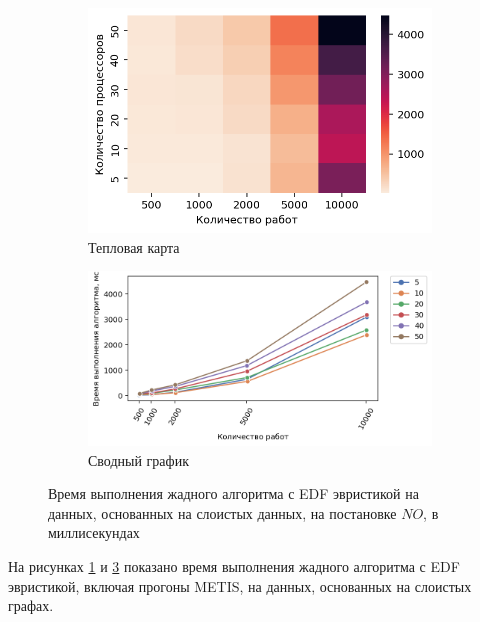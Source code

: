 \begin{figure}[!htbp]
    \centering
    \begin{subfigure}{0.49\textwidth}
        \includegraphics[width=\textwidth]{imgs/layered_class_1/NO_EDF/et_heatmap.png}
        \caption{Тепловая карта}
        \label{fig:NO-layered-EDF-exec-time-heatmap}
    \end{subfigure}
    \hfill
    \begin{subfigure}{0.49\textwidth}
        \includegraphics[width=\textwidth]{imgs/layered_class_1/NO_EDF/tr_graph.png}
        \caption{Сводный график}
        \label{fig:NO-layered-EDF-exec-time-compiled}
    \end{subfigure}
    \caption{Время выполнения жадного алгоритма с EDF эвристикой на данных, основанных на слоистых данных, на постановке $NO$, в миллисекундах}
\end{figure}

На рисунках \ref{fig:NO-layered-EDF-exec-time-heatmap} и \ref{fig:NO-layered-EDF-exec-time-compiled} показано время выполнения жадного алгоритма с EDF эвристикой, включая прогоны METIS, на данных, основанных на слоистых графах.

